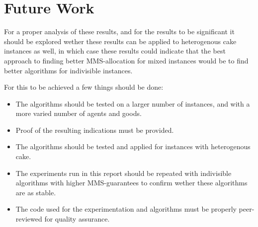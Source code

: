 \section{Future Work}\label{sec:future-work}

For a proper analysis of these results, and for the results to be significant it should be explored wether these results can be applied to heterogenous cake instances as well, in which case these results could indicate that the best approach to finding better MMS-allocation for mixed instances would be to find better algorithms for indivisible instances.

For this to be achieved a few things should be done:

\begin{itemize}
    \item The algorithms should be tested on a larger number of instances, and with a more varied number of agents and goods.
    \item Proof of the resulting indications must be provided.
    \item The algorithms should be tested and applied for instances with heterogenous cake.
    \item The experiments run in this report should be repeated with indivisible algorithms with higher MMS-guarantees to confirm wether these algorithms are as stable.
    \item The code used for the experimentation and algorithms must be properly peer-reviewed for quality assurance.
\end{itemize}




